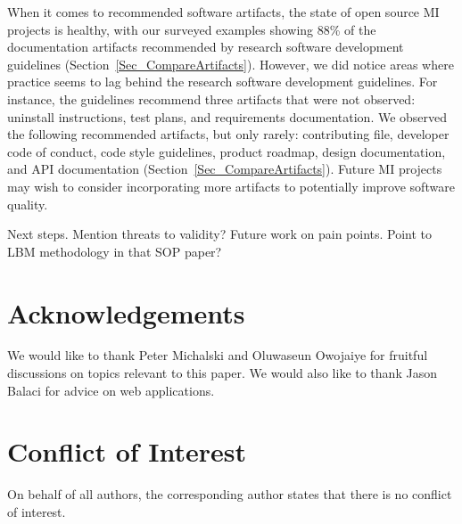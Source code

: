 \documentclass[11pt]{article}
\begin{document}
When it comes to recommended software artifacts, the state of open source MI projects is healthy, with our surveyed examples showing 88\%
of the documentation artifacts recommended by research software development
guidelines (Section~\ref{Sec_CompareArtifacts}).  However, we did notice
areas where practice seems to lag behind the research software development
guidelines.  For instance, the guidelines recommend three artifacts that were
not observed: uninstall instructions, test plans, and requirements
documentation. We observed the following recommended artifacts, but only rarely:
contributing file, developer code of conduct, code style guidelines, product
roadmap, design documentation, and API documentation
(Section~\ref{Sec_CompareArtifacts}).  Future MI projects may wish to consider incorporating more artifacts to potentially improve software quality.  

Next steps.  Mention threats to validity?  Future work on pain points.  Point to
LBM methodology in that SOP paper?

\section*{Acknowledgements}

We would like to thank Peter Michalski and Oluwaseun Owojaiye for fruitful
discussions on topics relevant to this paper.  We would also like to thank Jason
Balaci for advice on web applications.

\section*{Conflict of Interest}

On behalf of all authors, the corresponding author states that there is no
conflict of interest.



\end{document}
